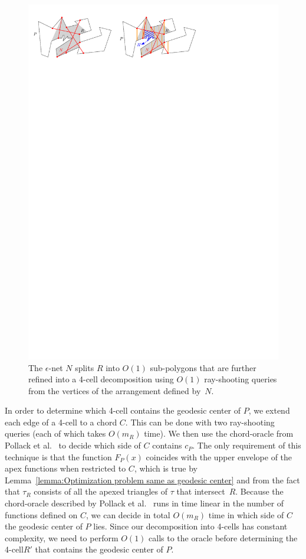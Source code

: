 \documentclass[a4paper,UKenglish]{lipics}
\newcommand{\F}[2]{\ensuremath{F_{\scriptscriptstyle #1}(#2)}}
\newcommand{\cp}{\ensuremath{c_P}}
\newcommand{\m}{\ensuremath{m_{\scriptscriptstyle R}}}
\newcommand{\reg}{\ensuremath{R'}}
\newcommand{\tcell}{4-cell\xspace}
\newcommand{\tcells}{4-cells\xspace}
\begin{document}
\begin{figure}[tb]
\centering
\includegraphics{img/CuttingOfChords.pdf}

\caption{\small The $\epsilon$-net $N$ splits $R$ into $O(1)$ sub-polygons that are further refined into a \tcell decomposition using $O(1)$ ray-shooting queries from the vertices of the arrangement defined by~$N$.}
\label{fig:Cutting of Chords}
\end{figure}

In order to determine which \tcell contains the geodesic center of $P$, 
we extend each edge of a \tcell to a chord $C$. 
This can be done with two ray-shooting queries (each of which takes $O(\m)$ time).
We then use the chord-oracle from Pollack et al.~\cite[Section~3]{pollackComputingCenter} to decide which side of $C$ contains $\cp$.
The only requirement of this technique is that the function $\F{P}{x}$ coincides with the upper envelope of the apex functions when restricted to $C$, which is true by Lemma~\ref{lemma:Optimization problem same as geodesic center} and from the fact that $\tau_R$ consists of all the apexed triangles of $\tau$ that intersect~$R$.
Because the chord-oracle described by Pollack et al.~\cite[Section~3]{pollackComputingCenter} runs in time linear in the number of functions defined on $C$, we can decide in total $O(\m)$ time in which side of $C$ the geodesic center of $P$ lies. 
Since our decomposition into \tcells has constant complexity, 
we need to perform $O(1)$ calls to the oracle before determining the \tcell $\reg$ that contains the geodesic center of $P$. 
\end{document}
